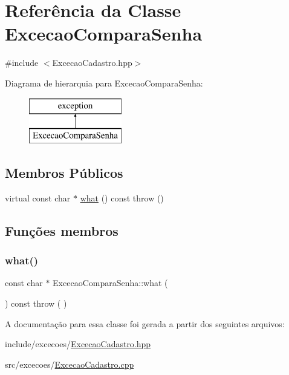 \hypertarget{class_excecao_compara_senha}{}\section{Referência da Classe Excecao\+Compara\+Senha}
\label{class_excecao_compara_senha}


{\ttfamily \#include $<$Excecao\+Cadastro.\+hpp$>$}

Diagrama de hierarquia para Excecao\+Compara\+Senha\+:\begin{figure}[H]
\begin{center}
\leavevmode
\includegraphics[height=2.000000cm]{class_excecao_compara_senha}
\end{center}
\end{figure}
\subsection*{Membros Públicos}
\begin{DoxyCompactItemize}
\item 
virtual const char $\ast$ \mbox{\hyperlink{class_excecao_compara_senha_a702b94b6df92b8188f7eb831ac388e8a}{what}} () const  throw ()
\end{DoxyCompactItemize}


\subsection{Funções membros}
\mbox{\label{class_excecao_compara_senha_a702b94b6df92b8188f7eb831ac388e8a}} 
\subsubsection{\texorpdfstring{what()}{what()}}
{\footnotesize\ttfamily const char $\ast$ Excecao\+Compara\+Senha\+::what (\begin{DoxyParamCaption}{ }\end{DoxyParamCaption}) const throw ( ) \hspace{0.3cm}{\ttfamily [virtual]}}



A documentação para essa classe foi gerada a partir dos seguintes arquivos\+:\begin{DoxyCompactItemize}
\item 
include/excecoes/\mbox{\hyperlink{_excecao_cadastro_8hpp}{Excecao\+Cadastro.\+hpp}}\item 
src/excecoes/\mbox{\hyperlink{_excecao_cadastro_8cpp}{Excecao\+Cadastro.\+cpp}}\end{DoxyCompactItemize}

